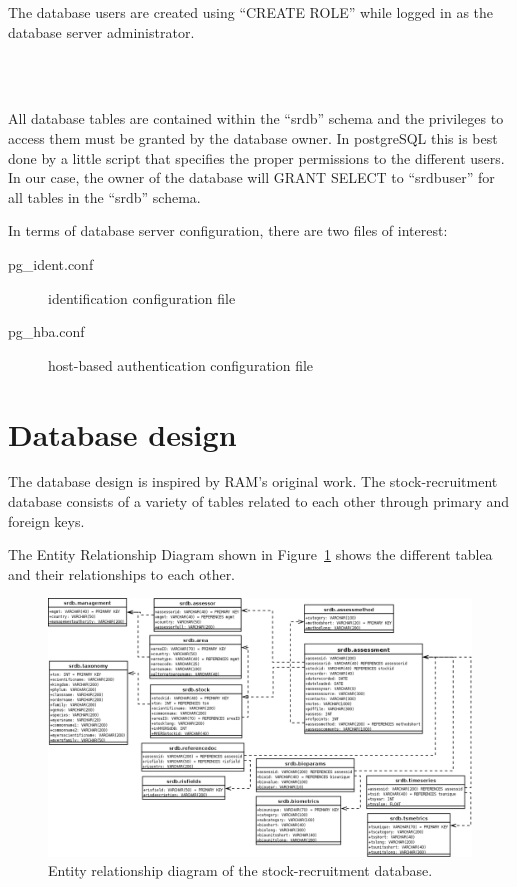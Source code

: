 \documentclass[letterpaper,12pt]{article}
\begin{document}
The database users are created using ``CREATE ROLE'' while logged in as the database server administrator. 

\begin{verbatim}

 
\end{verbatim}


All database tables are contained within the ``srdb'' schema and the privileges to access them must be granted by the database owner. In postgreSQL this is best done by a little script that specifies the proper permissions to the different users. In our case, the owner of the database will GRANT SELECT to ``srdbuser'' for all tables in the ``srdb'' schema.

In terms of database server configuration, there are two files of interest:

\begin{description}
 \item [pg\_ident.conf]{identification configuration file}
 \item [pg\_hba.conf]{host-based authentication configuration file}
 \end{description}



\section{Database design}

The database design is inspired by RAM's original work. The stock-recruitment database consists of a variety of tables related to each other through primary and foreign keys. 


The Entity Relationship Diagram shown in Figure~\ref{fig:erd} shows the different tablea and their relationships to each other.

\begin{figure}
 \begin{center}
 \includegraphics[angle=90, scale=0.3] {srdb-ERD.png}
\end{center}

\caption{Entity relationship diagram of the stock-recruitment database.}\label{fig:erd}
\end{figure} 
\end{document}
